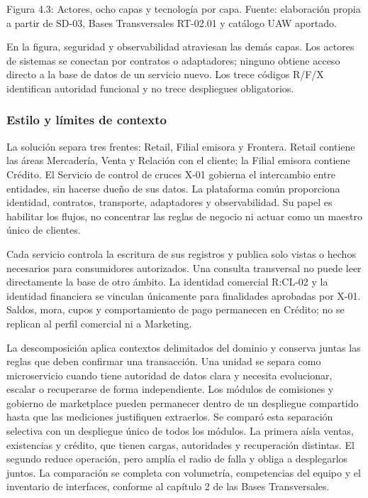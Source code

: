 \documentclass[11pt]{article}
\begin{document}
Figura 4.3: Actores, ocho capas y tecnología por capa. Fuente: elaboración propia a partir de SD-03, Bases Transversales RT-02.01 y catálogo UAW aportado.

En la figura, seguridad y observabilidad atraviesan las demás capas. Los actores de sistemas se conectan por contratos o adaptadores; ninguno obtiene acceso directo a la base de datos de un servicio nuevo. Los trece códigos R/F/X identifican autoridad funcional y no trece despliegues obligatorios.

\subsubsection{Estilo y límites de contexto}

La solución separa tres frentes: Retail, Filial emisora y Frontera. Retail contiene las áreas Mercadería, Venta y Relación con el cliente; la Filial emisora contiene Crédito. El Servicio de control de cruces X-01 gobierna el intercambio entre entidades, sin hacerse dueño de sus datos. La plataforma común proporciona identidad, contratos, transporte, adaptadores y observabilidad. Su papel es habilitar los flujos, no concentrar las reglas de negocio ni actuar como un maestro único de clientes.

Cada servicio controla la escritura de sus registros y publica solo vistas o hechos necesarios para consumidores autorizados. Una consulta transversal no puede leer directamente la base de otro ámbito. La identidad comercial R:CL-02 y la identidad financiera se vinculan únicamente para finalidades aprobadas por X-01. Saldos, mora, cupos y comportamiento de pago permanecen en Crédito; no se replican al perfil comercial ni a Marketing.

La descomposición aplica contextos delimitados del dominio y conserva juntas las reglas que deben confirmar una transacción. Una unidad se separa como microservicio cuando tiene autoridad de datos clara y necesita evolucionar, escalar o recuperarse de forma independiente. Los módulos de comisiones y gobierno de marketplace pueden permanecer dentro de un despliegue compartido hasta que las mediciones justifiquen extraerlos. Se comparó esta separación selectiva con un despliegue único de todos los módulos. La primera aísla ventas, existencias y crédito, que tienen cargas, autoridades y recuperación distintas. El segundo reduce operación, pero amplía el radio de falla y obliga a desplegarlos juntos. La comparación se completa con volumetría, competencias del equipo y el inventario de interfaces, conforme al capítulo 2 de las Bases Transversales.
\end{document}
